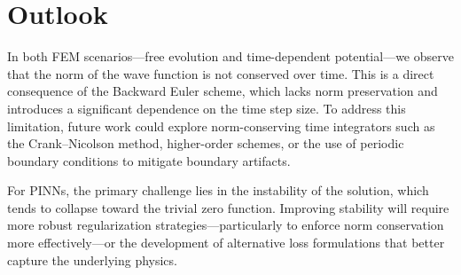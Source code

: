 \documentclass{article}
\theoremstyle{definition}
\theoremstyle{plain}
\theoremstyle{remark}
\begin{document}
\section{Outlook}

In both FEM scenarios—free evolution and time-dependent potential—we observe that the norm of the wave function is not conserved over time. This is a direct consequence of the Backward Euler scheme, which lacks norm preservation and introduces a significant dependence on the time step size. To address this limitation, future work could explore norm-conserving time integrators such as the Crank–Nicolson method, higher-order schemes, or the use of periodic boundary conditions to mitigate boundary artifacts.

For PINNs, the primary challenge lies in the instability of the solution, which tends to collapse toward the trivial zero function. Improving stability will require more robust regularization strategies—particularly to enforce norm conservation more effectively—or the development of alternative loss formulations that better capture the underlying physics.
\end{document}
